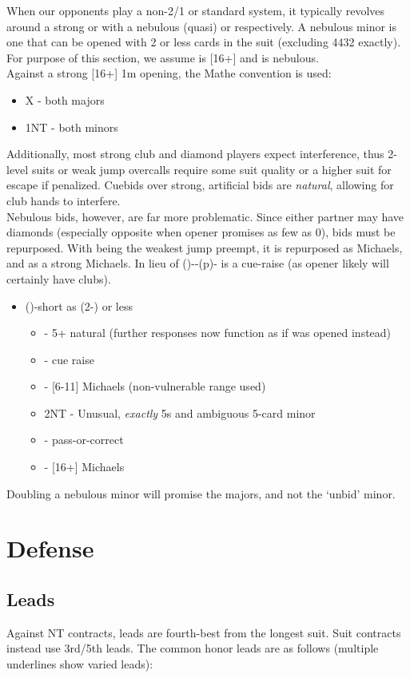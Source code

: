 \documentclass[12pt]{report}
\newcommand{\n}{\\}
\newcommand{\q}[1]{\multido{}{#1}{\qquad}}
\newcommand{\ul}[1]{\begin{itemize}#1\end{itemize}}
\newcommand{\li}[1]{\item[~] \q{#1}}
\begin{document}
    When our opponents play a non-2/1 or standard system, it typically revolves around a strong  or  with a nebulous (quasi)  or  respectively.  A nebulous minor is one that can be opened with 2 or less cards in the suit (excluding 4432 exactly).  For purpose of this section, we assume  is [16+] and  is nebulous. \n

    Against a strong [16+] 1m opening, the Mathe convention is used:

    \ul{
        \li0 X - both majors
        \li0 1NT - both minors
    }

    Additionally, most strong club and diamond players expect interference, thus 2-level suits or weak jump overcalls require some suit quality or a higher suit for escape if penalized.  Cuebids over strong, artificial bids are \textit{natural}, allowing for club hands to interfere.\n

    Nebulous bids, however, are far more problematic.  Since either partner may have diamonds (especially opposite when opener promises as few as 0), bids must be repurposed.  With  being the weakest jump preempt, it is repurposed as Michaels, and  as a strong Michaels.  In lieu of ()--(p)- is a cue-raise (as opener likely will certainly have clubs).
    
    \ul{
        \li0 ()-short as (2-) or less \ul {
            \li0 \di2 - 5+ natural (further responses now function as if \cl1 was opened instead)
                \li1 \cl3 - cue raise
            \li0 \he2 - [6-11] Michaels (non-vulnerable range used)
            \li0 2NT - Unusual, \textit{exactly} 5\he{}s and ambiguous 5-card minor
                \li1 \cl3 - pass-or-correct
            \li0 \di3 - [16+] Michaels
        }
    }

    Doubling a nebulous minor will promise the majors, and not the `unbid' minor.

\chapter{Defense} \label{5}

\section{Leads}

    Against NT contracts, leads are fourth-best from the longest suit.  Suit contracts instead use 3rd/5th leads. The common honor leads are as follows (multiple underlines show varied leads):
\end{document}
